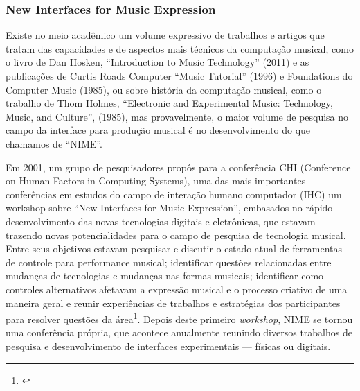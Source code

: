 
\subsubsection{New Interfaces for Music Expression}



Existe no meio acadêmico um volume expressivo de trabalhos e artigos que tratam das capacidades e de aspectos mais técnicos da computação musical, como o livro de Dan Hosken, ``Introduction to Music Technology'' (2011) e as publicações de Curtis Roads Computer ``Music Tutorial'' (1996) e Foundations do Computer Music (1985), ou sobre história da computação musical, como o trabalho de Thom Holmes, ``Electronic and Experimental Music: Technology, Music, and Culture'', (1985), mas provavelmente, o maior volume de pesquisa no campo da interface para produção musical é no desenvolvimento do que chamamos de ``NIME''. 

Em 2001, um grupo de pesquisadores propôs para a conferência CHI (Conference on Human Factors in Computing Systems), uma das mais importantes conferências em estudos do campo de interação humano computador (IHC) um workshop sobre ``New Interfaces for Music Expression'', embasados no rápido desenvolvimento das novas tecnologias digitais e eletrônicas, que estavam trazendo novas potencialidades para o campo de pesquisa de tecnologia musical. Entre seus objetivos estavam pesquisar e discutir o estado atual de ferramentas de controle para performance musical; identificar questões relacionadas entre mudanças de tecnologias e mudanças nas formas musicais; identificar como controles alternativos afetavam a expressão musical e o processo criativo de uma maneira geral e reunir experiências de trabalhos e estratégias dos participantes para resolver questões da área\footnote{\cite{Poupyrev2001}}. Depois deste primeiro \emph{workshop}, NIME se tornou uma conferência própria, que acontece anualmente reunindo diversos trabalhos de pesquisa e desenvolvimento de interfaces experimentais --- físicas ou digitais. 


